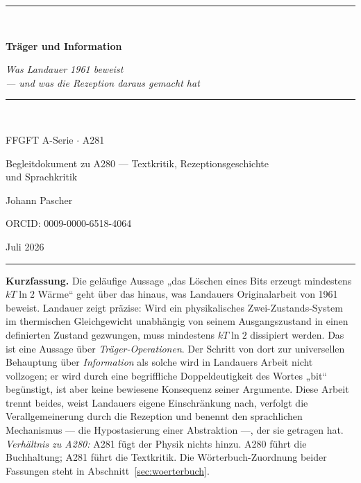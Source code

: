 \documentclass[11pt,a4paper]{article}
\theoremstyle{ffgft}
\begin{document}
\begin{titlepage}
\centering
\vspace*{2.2cm}
{\color{rulecol}\rule{0.5\textwidth}{0.6pt}}\\[1.4cm]
{\color{accent}\Huge\bfseries Träger und Information\par}
\vspace{1.0cm}
{\large\itshape Was Landauer 1961 beweist\\ --- und was die Rezeption daraus gemacht hat\par}
\vspace{0.6cm}
{\color{accent2}\rule{0.28\textwidth}{0.4pt}}\\[1.0cm]
{\large FFGFT A-Serie $\cdot$ A281\par}
\vspace{0.4cm}
{\normalsize Begleitdokument zu A280 --- Textkritik, Rezeptionsgeschichte\\ und Sprachkritik\par}
\vfill
{\large Johann Pascher\par}
\vspace{0.3cm}
{\footnotesize ORCID: 0009-0000-6518-4064\par}
\vspace{0.2cm}
{\footnotesize Juli 2026\par}
\vspace{1.4cm}
{\color{rulecol}\rule{0.5\textwidth}{0.6pt}}
\vspace*{1.5cm}
\end{titlepage}

\tableofcontents
\thispagestyle{fancy}
\clearpage

\begingroup\small\noindent
\textbf{Kurzfassung.} Die geläufige Aussage „das Löschen eines Bits erzeugt
mindestens $kT\ln 2$ Wärme“ geht über das hinaus, was Landauers Originalarbeit von
1961 beweist. Landauer zeigt präzise: Wird ein physikalisches
Zwei-Zustands-System im thermischen Gleichgewicht unabhängig von seinem
Ausgangszustand in einen definierten Zustand gezwungen, muss mindestens
$kT\ln 2$ dissipiert werden. Das ist eine Aussage über \emph{Träger-Operationen}.
Der Schritt von dort zur universellen Behauptung über \emph{Information} als
solche wird in Landauers Arbeit nicht vollzogen; er wird durch eine begriffliche
Doppeldeutigkeit des Wortes „bit“ begünstigt, ist aber keine bewiesene Konsequenz
seiner Argumente. Diese Arbeit trennt beides, weist Landauers eigene
Einschränkung nach, verfolgt die Verallgemeinerung durch die Rezeption und
benennt den sprachlichen Mechanismus --- die Hypostasierung einer Abstraktion ---,
der sie getragen hat. \emph{Verhältnis zu A280:} A281 fügt der Physik nichts hinzu.
A280 führt die Buchhaltung; A281 führt die Textkritik. Die Wörterbuch-Zuordnung
beider Fassungen steht in Abschnitt~\ref{sec:woerterbuch}.
\par\endgroup
\end{document}
